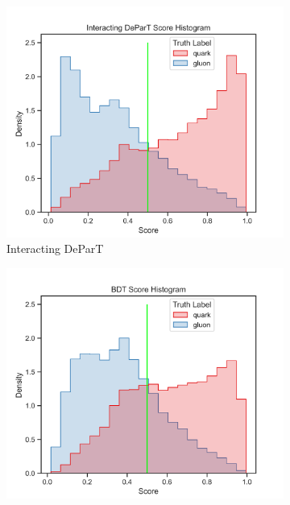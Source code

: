 \begin{figure}[ht]
    \centering
    \begin{subfigure}[b]{0.49\textwidth}
        \centering
        \includegraphics[width=\textwidth]{src/plots/results/score/interacting_depart.png}
        \caption{Interacting DeParT}
        \label{fig:score_depart}
    \end{subfigure}
    \begin{subfigure}[b]{0.49\textwidth}
        \centering
        \includegraphics[width=\textwidth]{src/plots/results/score/bdt.png}

\end{subfigure}
\end{figure}
